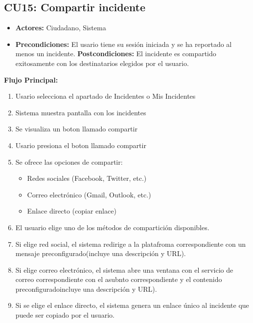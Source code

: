 \begin{multicols}{2}
\subsection*{CU15: Compartir incidente}
\begin{itemize}
    \item \textbf{Actores:} Ciudadano, Sistema
    \item \textbf{Precondiciones:} El usario tiene su sesión iniciada y se ha reportado al menos un incidente.
    \iem \textbf{Postcondiciones:} El incidente es compartido exitosamente con los destinatarios elegidos por el usuario.
\end{itemize}
\textbf{Flujo Principal:}
\begin{enumerate}
    \item Usario selecciona el apartado de Incidentes o Mis Incidentes
    \item Sistema muestra pantalla con los incidentes
    \item Se visualiza un boton llamado compartir
    \item Usario presiona el boton llamado compartir
    \item Se ofrece las opciones de compartir:
    \begin{itemize}
        \item Redes sociales (Facebook, Twitter, etc.)
        \item Correo electrónico (Gmail, Outlook, etc.)
        \item Enlace directo (copiar enlace)
    \end{itemize}
    \item El usuario elige uno de los métodos de compartición disponibles.
    \item Si elige red social, el sistema redirige a la platafroma correspondiente con un mensaje preconfigurado(incluye una descripción y URL).
    \item Si elige correo electrónico, el sistema abre una ventana con el servicio de correo correspondiente con el asubnto correspondiente y el contenido preconfiguradoincluye una descripción y URL).
    \item Si se elige el enlace directo, el sistema genera un enlace único al incidente que puede ser copiado por el usuario.
\end{enumerate}


\end{multicols}
